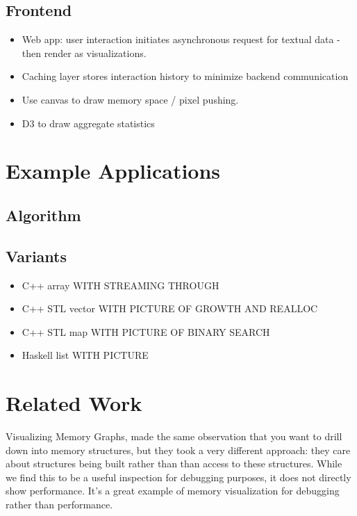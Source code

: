 \documentclass[annual]{acmsiggraph}
\begin{document}
  \subsection{Frontend}
    \begin{itemize}
      \item Web app: user interaction initiates asynchronous request for textual data - then render as visualizations.
      \item Caching layer stores interaction history to minimize backend communication
      \item Use canvas to draw memory space / pixel pushing.
      \item D3 to draw aggregate statistics
    \end{itemize}

\section {Example Applications}
  \subsection{Algorithm}
  \subsection{Variants}
    \begin{itemize}
      \item C++ array WITH STREAMING THROUGH
      \item C++ STL vector WITH PICTURE OF GROWTH AND REALLOC
      \item C++ STL map WITH PICTURE OF BINARY SEARCH
      \item Haskell list WITH PICTURE
    \end{itemize}

\section{Related Work}

Visualizing Memory Graphs\cite{zimmerman:2001:VMG}, made the same observation that you want to drill down into memory structures, but they took a very different approach: they care about structures being built rather than than access to these structures. While we find this to be a useful inspection for debugging purposes, it does not directly show performance. It's a great example of memory visualization for debugging rather than performance.
\end{document}
